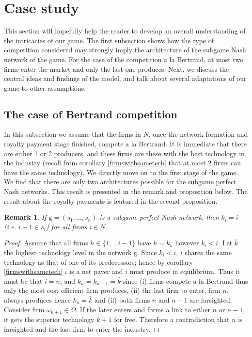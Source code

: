 \documentclass{article}
\newtheorem{remark}{Remark}
\begin{document}
\section{Case study}
This section will hopefully help the reader to develop an overall understanding of the intricacies of our game. The first subsection shows how the type of competition considered may strongly imply the architecture of the subgame Nash network of the game. For the case of the competition a la Bertrand, at most two firms enter the market and only the last one produces. Next, we discuss the central ideas and findings of the model, and talk about several adaptations of our game to other assumptions. 
    
\subsection{The case of Bertrand competition}
In this subsection we assume that the firms in $N$, once the network formation and royalty payment stage finished, compete a la Bertrand. It is immediate that there are either 1 or 2 producers, and these firms are these with the best technology in the industry (recall from corollary \ref{firmswithsametech} that at most 2 firms can have the same technology). We directly move on to the first stage of the game. We find that there are only two architectures possible for the subgame perfect Nash networks. This result is presented in the remark and proposition below. The result about the royalty payments is featured in the second proposition. \\

\begin{remark}\label{bertrand is a chain}
If $\text{g}=(s_1,\ldots, s_n)$ is a subgame perfect Nash network, then $k_i=i$ (i.e. $i-1\in s_i$) for all firms $i\in N$.
\end{remark} 
\begin{proof}
Assume that all firms $h\in \{1,\ldots i-1\}$ have $h=k_h$ however $k_i<i$. Let $\bar{k}$ the highest technology level in the network $\text{g}$. Since $k_i<i$, $i$ shares the same technology as that of one of its predecessors; hence by corollary \ref{firmswithsametech} $i$ is a net payer and $i$ must produce in equilibrium. Thus it must be that $i=n$; and $k_n=k_{n-1}=\bar{k}$ since (i) firms compete a la Bertrand thus only the most cost efficient firm produces, (ii) the last firm to enter, firm $n$, always produces hence $k_n=\bar{k}$ and (ii) both firms $n$ and $n-1$ are farsighted. Consider firm $\omega_{n+1}\in \Omega$. If the later enters and forms a link to either $n$ or $n-1$, it gets the superior technology $\bar{k}+1$ for free. Therefore a contradiction that $n$ is farsighted and the last firm to enter the industry.    
\end{proof}
\end{document}
